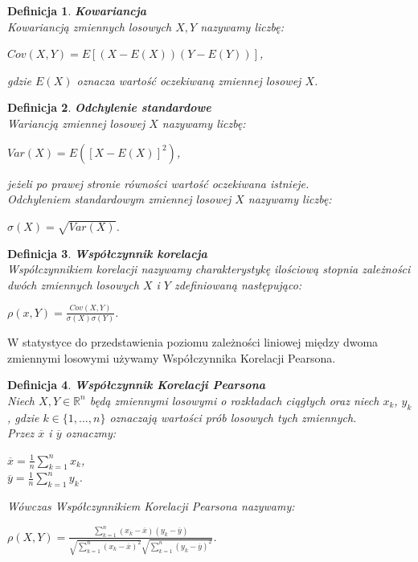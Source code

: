 \documentclass[12pt,a4paper]{report}
\newtheorem{df}{Definicja}
\begin{document}
\begin{df}\textbf{Kowariancja}
\\Kowariancją zmiennych losowych $X,Y$ nazywamy liczbę:
\begin{center}
$Cov(X,Y) = E[(X-E(X))(Y-E(Y))]$,
\end{center}
gdzie $E(X)$ oznacza wartość oczekiwaną zmiennej losowej $X$.
\end{df}
\begin{df}\textbf{Odchylenie standardowe}
\\Wariancją zmiennej losowej $X$ nazywamy liczbę:
\begin{center}
$Var(X)=E([X-E(X)]^2)$,
\end{center}
jeżeli po prawej stronie równości wartość oczekiwana istnieje. 
\\Odchyleniem standardowym zmiennej losowej $X$ nazywamy liczbę:
\begin{center}
$\sigma(X)=\sqrt{Var(X)}$.
\end{center}
\end{df}
\begin{df}\textbf{Współczynnik korelacja}
\\Współczynnikiem korelacji nazywamy charakterystykę ilościową stopnia zależności dwóch zmiennych losowych $X$ i $Y$ zdefiniowaną następująco:
\begin{center}
$\rho(x,Y) = \frac{Cov(X,Y)}{\sigma(X)\sigma(Y)}$.
\end{center}
\end{df}
W statystyce do przedstawienia poziomu zależności liniowej między dwoma zmiennymi losowymi używamy Współczynnika Korelacji Pearsona.
\begin{df}\textbf{Współczynnik Korelacji Pearsona}
\\Niech $X,Y \in \mathbb{R}^n$ będą zmiennymi losowymi o rozkładach ciągłych oraz niech $x_k$, $y_k$, gdzie $k\in\{1,...,n\}$ oznaczają wartości prób losowych tych zmiennych. 
\\Przez $\overline{x}$ i $\overline{y}$ oznaczmy:
\begin{center}
$\overline{x}=\frac{1}{n} \sum_{k=1}^n x_k$,
\\$\overline{y}=\frac{1}{n} \sum_{k=1}^n y_k$.
\end{center}
Wówczas Współczynnikiem Korelacji Pearsona nazywamy:
\begin{center}
$\rho(X,Y) = \frac{\sum_{k=1}^n(x_k - \overline{x})(y_k - \overline{y})}{\sqrt{\sum_{k=1}^n(x_k - \overline{x})^2} \sqrt{\sum_{k=1}^n(y_k - \overline{y})^2 }}$.
\end{center}
\end{df}
\end{document}
